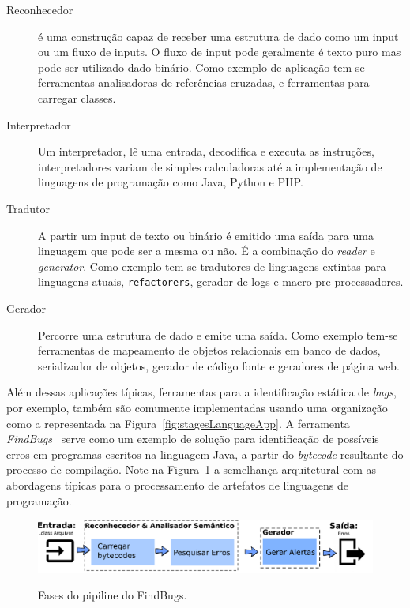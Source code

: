 \begin{description}

\item[Reconhecedor] \'{e} uma construç\~{a}o capaz de receber uma estrutura de dado como um input ou um fluxo de inputs. O fluxo de input pode geralmente \'{e} texto puro mas pode ser utilizado dado bin\'{a}rio. Como exemplo de aplicaç\~{a}o tem-se ferramentas analisadoras de referências cruzadas, e ferramentas para carregar classes.

\item[Interpretador] Um interpretador, lê uma entrada, decodifica e executa as instruç\~{o}es, interpretadores variam de simples calculadoras at\'{e} a implementaç\~{a}o de linguagens de programaç\~{a}o como Java, Python e PHP.

\item[Tradutor]A partir um input de texto ou bin\'{a}rio \'{e} emitido uma sa\'{i}da para uma linguagem que pode ser a mesma ou n\~{a}o. É a combinaç\~{a}o do \textit{reader} e \textit{generator}. Como exemplo tem-se tradutores de linguagens extintas para linguagens atuais, \texttt{refactorers},  gerador de logs e macro pre-processadores.
	
\item[Gerador] Percorre uma estrutura de dado e emite uma sa\'{i}da. Como exemplo tem-se ferramentas de mapeamento de objetos relacionais em banco de dados, serializador de objetos, gerador de c\'{o}digo fonte e geradores de p\'{a}gina web.

\end{description}


Além dessas aplicações típicas, ferramentas para a identificação estática de \emph{bugs}, por exemplo, também são comumente implementadas usando uma organização como a representada na Figura~\ref{fig:stagesLanguageApp}. A ferramenta \textit{FindBugs}~\cite{FindBugs} serve como um exemplo de solu\c c\~{a}o para identifica\c c\~{a}o  de poss\'{i}veis erros em programas escritos na linguagem Java, a partir do \emph{bytecode} resultante do processo de compila\c c\~{a}o. Note na Figura~\ref{fig:findBugs} a semelhan\c ca arquitetural com as abordagens t\'{i}picas para o processamento de artefatos de linguagens de programa\c c\~{a}o. 

\begin{figure}[h]
	\center
	\includegraphics[scale=0.9]{Imagens/pipelineFindbugs}
	\label{fig:findBugs}
	\caption{Fases do pipiline do FindBugs.}
\end{figure}


